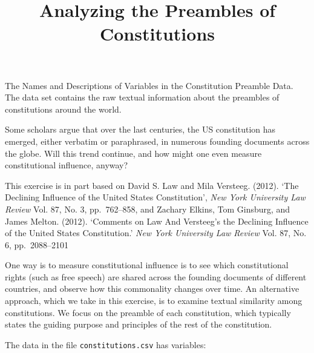 \documentclass[]{article}
\title{Analyzing the Preambles of Constitutions}
\author{}
\date{}
\begin{document}
\maketitle


The Names and Descriptions of Variables in the Constitution Preamble
Data. The data set contains the raw textual information about the
preambles of constitutions around the world.

Some scholars argue that over the last centuries, the US constitution
has emerged, either verbatim or paraphrased, in numerous founding
documents across the globe. Will this trend continue, and how might one
even measure constitutional influence, anyway?

This exercise is in part based on David S. Law and Mila Versteeg.
(2012). `The Declining Influence of the United States Constitution',
\emph{New York University Law Review} Vol. 87, No. 3, pp.~762--858, and
Zachary Elkins, Tom Ginsburg, and James Melton. (2012). `Comments on Law
And Versteeg's the Declining Influence of the United States
Constitution.' \emph{New York University Law Review} Vol. 87, No. 6,
pp.~2088--2101

One way is to measure constitutional influence is to see which
constitutional rights (such as free speech) are shared across the
founding documents of different countries, and observe how this
commonality changes over time. An alternative approach, which we take in
this exercise, is to examine textual similarity among constitutions. We
focus on the preamble of each constitution, which typically states the
guiding purpose and principles of the rest of the constitution.

The data in the file \texttt{constitutions.csv} has variables:
\end{document}

